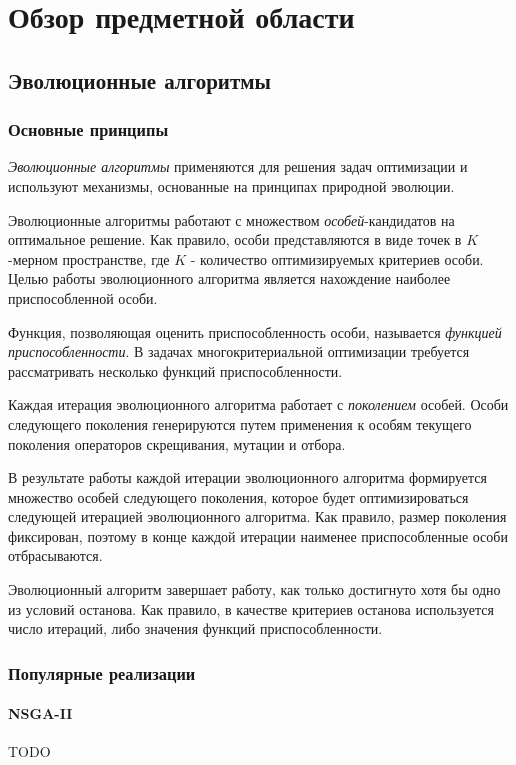 \chapter{Обзор предметной области}
\label{chapter1}

\section{Эволюционные алгоритмы}
\label{evo_algs}

\subsection{Основные принципы}
\textit{Эволюционные алгоритмы} применяются для решения задач оптимизации и используют механизмы, 
основанные на принципах природной эволюции.\cite{petrova_evo1} 

Эволюционные алгоритмы работают с множеством \textit{особей}-кандидатов на оптимальное решение. 
Как правило, особи представляются в виде точек в $K$-мерном пространстве, где $K$ - количество 
оптимизируемых критериев особи. Целью работы эволюционного алгоритма является нахождение наиболее 
приспособленной особи.

Функция, позволяющая оценить приспособленность особи, называется \textit{функцией приспособленности}.
В задачах многокритериальной оптимизации требуется рассматривать несколько функций приспособленности.

Каждая итерация эволюционного алгоритма работает с \textit{поколением} особей. Особи следующего 
поколения генерируются путем применения к особям текущего поколения операторов скрещивания, 
мутации и отбора.

В результате работы каждой итерации эволюционного алгоритма формируется множество особей следующего 
поколения, которое будет оптимизироваться следующей итерацией эволюционного алгоритма. Как правило, 
размер поколения фиксирован, поэтому в конце каждой итерации наименее приспособленные особи 
отбрасываются.

Эволюционный алгоритм завершает работу, как только достигнуто хотя бы одно из условий останова.
Как правило, в качестве критериев останова используется число итераций, либо значения функций
приспособленности.

\subsection{Популярные реализации}
\subsubsection{NSGA-II}
TODO